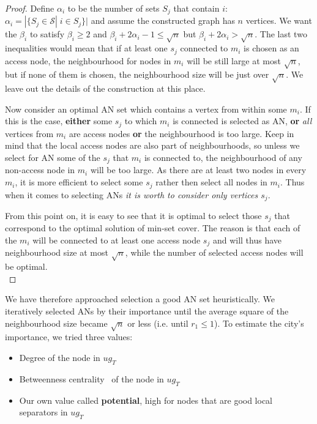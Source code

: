 \documentclass{svk_long_en}
\newcommand{\indt}{\hspace{6ex}}
\begin{document}
\begin{proof}
			\noindent Define $\alpha_{i}$ to be the number of sets $S_{j}$ that contain $i$: $\alpha_{i} = |\{S_{j} \in \mathcal{S}| \; i \in S_{j}\}|$ and assume the constructed graph has $n$ vertices. We want the $\beta_{i}$ to satisfy $\beta_{i} \geq 2$ and $\beta_{i} + 2\alpha_{i} - 1 \leq \sqrt{n}$ but $\beta_{i} + 2\alpha_{i} > \sqrt{n}$. The last two inequalities would mean that if at least one $s_{j}$ connected to $m_{i}$ is chosen as an access node, the neighbourhood for nodes in $m_{i}$ will be still large at most $\sqrt{n}$, but if none of them is chosen, the neighbourhood size will be just over $\sqrt{n}$. We leave out the details of the construction at this place. 
			
			\indt Now consider an optimal AN set which contains a vertex from within some $m_{i}$. If this is the case, \textbf{either} some $s_{j}$ to which $m_{i}$ is connected is selected as AN, \textbf{or} \textit{all} vertices from $m_{i}$ are access nodes \textbf{or} the neighbourhood is too large. Keep in mind that the local access nodes are also part of neighbourhoods, so unless we select for AN some of the $s_{j}$ that $m_{i}$ is connected to, the neighbourhood of any non-access node in $m_{i}$ will be too large. As there are at least two nodes in every $m_{i}$, it is more efficient to select some $s_{j}$ rather then select all nodes in $m_{i}$. Thus when it comes to selecting ANs \textit{it is worth to consider only vertices $s_{j}$}.
			
			\indt From this point on, it is easy to see that it is optimal to select those $s_{j}$ that correspond to the optimal solution of min-set cover. The reason is that each of the $m_{i}$ will be connected to at least one access node $s_{j}$ and will thus have neighbourhood size at most $\sqrt{n}$, while the number of selected access nodes will be optimal. \\
		\end{proof}
		
		We have therefore approached selection a good AN set heuristically. We iteratively selected ANs by their importance until the average square of the neighbourhood size became $\sqrt{n}$ or less (i.e. until $r_{1} \leq 1$). To estimate the city's importance, we tried three values:
		\begin{itemize}
			\item Degree of the node in $ug_{T}$
			\item Betweenness centrality~\cite{centrality01} of the node in $ug_{T}$
			\item Our own value called \textbf{potential}, high for nodes that are good local separators in $ug_{T}$
		\end{itemize}
		\hspace{\fill}
		
\end{document}
